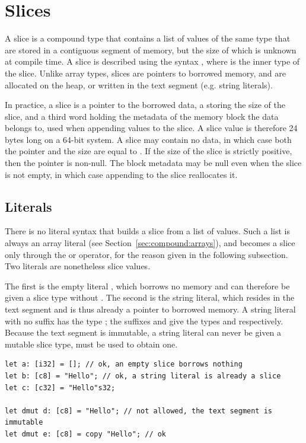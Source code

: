 \section{Slices}%
\label{sec:compound:slices}

A slice is a compound type that contains a list of values of the same type that
are stored in a contiguous segment of memory, but the size of which is unknown
at compile time. A slice is described using the syntax \token{[T]}, where
 is the inner type of the slice. Unlike array types, slices are
pointers to borrowed memory, and are allocated on the heap, or written in the
text segment (e.g. string literals).

In practice, a slice is a pointer  to the borrowed data, a
 storing the size of the slice, and a third word holding the
metadata of the memory block the data belongs to, used when appending values to
the slice. A slice value is therefore 24 bytes long on a 64-bit system. A slice
may contain no data, in which case both the pointer and the size are equal to
. If the size of the slice is strictly positive, then the pointer is
non-null. The block metadata may be null even when the slice is not empty, in
which case appending to the slice reallocates it.




\subsection{Literals}

There is no literal syntax that builds a slice from a list of values. Such a
list is always an array literal (see Section~\ref{sec:compound:arrays}), and becomes a
slice only through the  or  operator, for the reason
given in the following subsection. Two literals are nonetheless slice values.

The first is the empty literal \token{[]}, which borrows no memory and can
therefore be given a slice type without . The second is the string
literal, which resides in the text segment and is thus already a pointer to
borrowed memory. A string literal with no suffix has the type \token{[c8]}; the
suffixes  and  give the types \token{[c8]} and
\token{[c32]} respectively. Because the text segment is immutable, a string
literal can never be given a mutable slice type,  must be used to
obtain one.

\begin{lstlisting}[style=coloredverbatimError]
let a: [i32] = []; // ok, an empty slice borrows nothing
let b: [c8] = "Hello"; // ok, a string literal is already a slice
let c: [c32] = "Hello"s32;

let dmut d: [c8] = "Hello"; // not allowed, the text segment is immutable
let dmut e: [c8] = copy "Hello"; // ok
\end{lstlisting}

